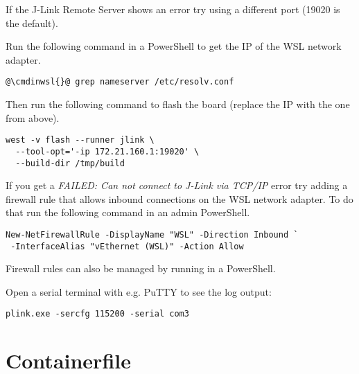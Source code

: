 \begin{infobox}
  If the J-Link Remote Server shows an error try using a different port
  (19020 is the default).
\end{infobox}

Run the following command in a PowerShell to get the IP of the WSL network
adapter.

\begin{lstlisting}
@\cmdinwsl{}@ grep nameserver /etc/resolv.conf
\end{lstlisting}

Then run the following command to flash the board (replace the IP with the one
from above).

\begin{lstlisting}
west -v flash --runner jlink \
  --tool-opt='-ip 172.21.160.1:19020' \
  --build-dir /tmp/build
\end{lstlisting}

\begin{infobox}
  If you get a \emph{FAILED: Can not connect to J-Link via TCP/IP} error try
  adding a firewall rule that allows inbound connections on the WSL network
  adapter. To do that run the following command in an admin PowerShell.

  \begin{lstlisting}
New-NetFirewallRule -DisplayName "WSL" -Direction Inbound `
 -InterfaceAlias "vEthernet (WSL)" -Action Allow
\end{lstlisting}

  Firewall rules can also be managed by running  in a PowerShell.
\end{infobox}

Open a serial terminal with e.g. PuTTY to see the log output:

\begin{lstlisting}
plink.exe -sercfg 115200 -serial com3
\end{lstlisting}

\newpage

\fancyfoot{}

\appendix

\section{Containerfile}\label{containerfile}




